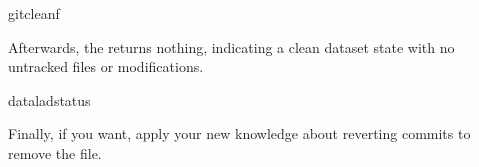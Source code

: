 \begin{sphinxVerbatim}[commandchars=\\\{\}]
gitclean\PYGZhy{}f
\end{sphinxVerbatim}

\sphinxAtStartPar
Afterwards, the  returns nothing, indicating a
clean dataset state with no untracked files or modifications.

\begin{sphinxVerbatim}[commandchars=\\\{\}]
dataladstatus
\end{sphinxVerbatim}

\sphinxAtStartPar
Finally, if you want, apply your new knowledge about reverting commits
to remove the  file.

\sphinxstepscope


